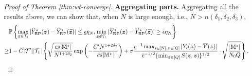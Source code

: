\documentclass[12pt]{article}
\begin{document}
\begin{proof}[Proof of Theorem \ref{thm:wt-converge}]
\textbf{Aggregating parts.} Aggregating all the results above, we can show that, when $N$ is large enough, i.e., $N>n(\delta_1,\delta_2,\delta_3)$,
\begin{align}
     &{\mathbb{P}}\left\{\max_{{\boldsymbol{z}}\in{\mathcal{T}}_{1}}|{\widehat{Y}}^\star_{\operatorname{RP}}({\boldsymbol{z}}) - {\widehat{Y}}^\star_{\operatorname{RP}}(\widetilde{{\boldsymbol{z}}})|\le \underline{\epsilon}\eta_N, \min_{{\boldsymbol{z}}\notin{\mathcal{T}}_{1}}|{\widehat{Y}}^\star_{\operatorname{RP}}({\boldsymbol{z}}) - {\widehat{Y}}^\star_{\operatorname{RP}}(\widetilde{{\boldsymbol{z}}})|\ge \bar{\epsilon}\eta_N \right\} \notag\\
     \ge & 1 -  C|{\mathcal{T}}'||{\mathcal{T}}_{1}|\left\{\sqrt{\frac{\bar{c}\bar{s}|{\mathbb{M}}^\star|}{N^{1+2\delta_2}}}\exp\left(-\frac{C'N^{1+2\delta_2}}{\bar{c}\bar{s}|{\mathbb{M}}^\star|}\right)+\sigma   \frac{ \underline{c}^{-1} \max_{i\in[N],{\boldsymbol{z}}\in[Q]}|Y_i({\boldsymbol{z}})-\overline{Y}({\boldsymbol{z}})|}{ {\overline{c}^{-1/2} \{\min_{{\boldsymbol{z}}\in[Q]} S({\boldsymbol{z}},{\boldsymbol{z}})}\}^{1/2}}\cdot \sqrt{\frac{|{\mathbb{M}}^\star|}{N_0Q}}\right\}. \label{eqn:key-bound}
\end{align}

   


\end{proof}
\end{document}
